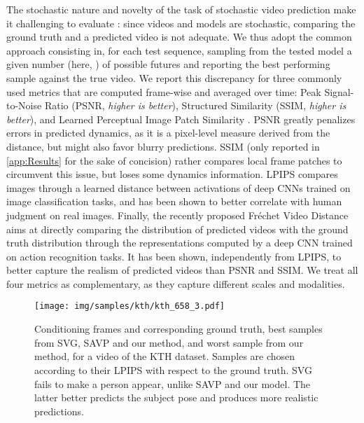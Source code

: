 \documentclass{article}
\begin{document}
The stochastic nature and novelty of the task of stochastic video prediction make it challenging to evaluate \citep{Lee2018}: since videos and models are stochastic, comparing the ground truth and a predicted video is not adequate.
We thus adopt the common approach \citep{Denton2018, Lee2018} consisting in, for each test sequence, sampling from the tested model a given number (here, ) of possible futures and reporting the best performing sample against the true video.
We report this discrepancy for three commonly used metrics that are computed frame-wise and averaged over time: Peak Signal-to-Noise Ratio (PSNR, \emph{higher is better}), Structured Similarity (SSIM, \emph{higher is better}), and Learned Perceptual Image Patch Similarity \citep[LPIPS, \emph{lower is better},][]{Zhang2018}.
PSNR greatly penalizes errors in predicted dynamics, as it is a pixel-level measure derived from the  distance, but might also favor blurry predictions.
SSIM (only reported in \cref{app:Results} for the sake of concision) rather compares local frame patches to circumvent this issue, but loses some dynamics information. 
LPIPS compares images through a learned distance between activations of deep CNNs trained on image classification tasks, and has been shown to better correlate with human judgment on real images.
Finally, the recently proposed Fréchet Video Distance \citep[FVD, \emph{lower is better},][]{Unterthiner2018} aims at directly comparing the distribution of predicted videos with the ground truth distribution through the representations computed by a deep CNN trained on action recognition tasks.
It has been shown, independently from LPIPS, to better capture the realism of predicted videos than PSNR and SSIM.
We treat all four metrics as complementary, as they capture different scales and modalities.

\begin{figure*}
    \centering
    \texttt{[image: img/samples/kth/kth\_658\_3.pdf]}
    \vspace{-0.2in}
    \caption{
        \label{fig:kth-sample-1}
        Conditioning frames and corresponding ground truth, best samples from SVG, SAVP and our method, and worst sample from our method, for a video of the KTH dataset.
        Samples are chosen according to their LPIPS with respect to the ground truth.
        SVG fails to make a person appear, unlike SAVP and our model.
        The latter better predicts the subject pose and produces more realistic predictions.
    }
    \vspace{-0.13in}
\end{figure*}
 
\end{document}
